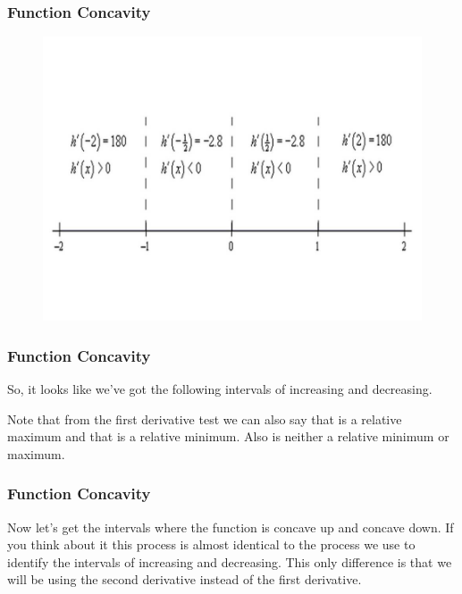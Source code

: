\documentclass{beamer}
\begin{document}
\begin{frame} 
\frametitle{Function Concavity}
\begin{figure}
\centering
\includegraphics[width=0.99\linewidth]{CurveSketchingGraphs1/Slide7}
\caption{}
\label{fig:Slide7}
\end{figure}



\end{frame}
\begin{frame} 
	\frametitle{Function Concavity}
 
 So, it looks like we’ve got the following intervals of increasing and decreasing.
 
 
 Note that from the first derivative test we can also say that  is a relative maximum and that  is a relative minimum.  Also  is neither a relative minimum or maximum.
\end{frame}
\begin{frame} 
	\frametitle{Function Concavity}
 Now let’s get the intervals where the function is concave up and concave down.  If you think about it this process is almost identical to the process we use to identify the intervals of increasing and decreasing.  This only difference is that we will be using the second derivative instead of the first derivative.
\end{frame}
\end{document}
